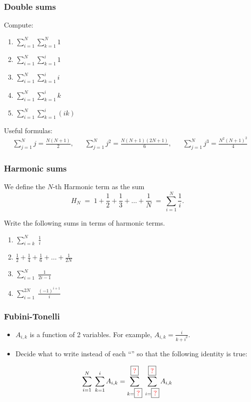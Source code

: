 \documentclass[14pt]{beamer}
\newcommand {\DS} [1] {${\displaystyle #1}$}
\newcommand{\rojo}[1]{{\color{red} #1}}
\newcommand{\cajar}[1]{\boxed{\mbox{\rojo{ #1}}}}
\newcommand{\majar}[1]{\boxed{\rojo{ #1}}}
\newcommand{\setsize}[1]{\fontsize{#1}{#1}\selectfont} %
\newcommand{\smallerfont}{\setsize{13}} %
\begin{document}
\begin{frame}[t]
\frametitle{Double sums}

Compute:
\begin{multicols}{3}
\begin{enumerate}
	\item \DS{\sum_{i=1}^{N} \sum_{k=1}^N 1 }
	\item \DS{ \sum_{i=1}^{N} \sum_{k=1}^{i} 1}
	\item \DS{ \sum_{i=1}^{N} \sum_{k=1}^{i} i}
	\item \DS{ \sum_{i=1}^{N} \sum_{k=1}^i k }
	\item \DS{ \sum_{i=1}^{N} \sum_{k=1}^i (ik) }
\end{enumerate}
\end{multicols}

\vfill

{\setsize{10}
Useful formulas:
\begin{align*}
& \sum_{j=1}^{N} j = \frac{N(N+1)}{2}, && \sum_{j=1}^N j^2 = \frac{N(N+1)(2N+1)}{6}, && \sum_{j=1}^{N} j^3 = \frac{N^2(N+1)^2}{4}
\end{align*}
}

\end{frame}
\begin{frame}[t]
\smallerfont
\frametitle{Harmonic sums}

We define the $N$-th Harmonic term as the  sum
$$H_N \; = \; 1 + \frac 12 + \frac 13 +  \ldots + \frac 1N \; = \; \sum_{i=1}^{N} \frac{1}{i}.$$ 

Write the following sums in terms of harmonic terms. 

	\begin{multicols}{2}
	\begin{enumerate}
		\item \DS{\sum_{i=k}^{N} \; \frac{1}{i}}
		\item \DS{\frac 12 + \frac 14 + \frac 16 + \ldots + \frac 1{2N}}  
		\item \DS{\sum_{i=1}^{N} \; \frac{1}{2i-1}}
		\item \DS{\sum_{i=1}^{2N} \; \frac{(-1)^{i+1}}{i}}
	\end{enumerate}
	\end{multicols}

\end{frame}
\begin{frame}[t]
\smallerfont
\frametitle{Fubini-Tonelli}

\begin{itemize}
\item  $A_{i,k}$ is a function of 2 variables. \;
For example, \DS{A_{i,k} = \frac{i}{k+i^2}}.
\item Decide what to write instead of each ``\cajar{?}'' so that the following identity is true:
\end{itemize}

{\setsize{20}
	\begin{equation*}
		\sum_{i=1}^{N} \; \sum_{k=1}^{i}  
		A_{i, k} 
		= \sum_{k = \majar{?}}^{\majar{?}} \; \sum_{i=\majar{?}}^{\majar{?}} 
		A_{i,k}
	\end{equation*}
}

\end{frame}
\end{document}
